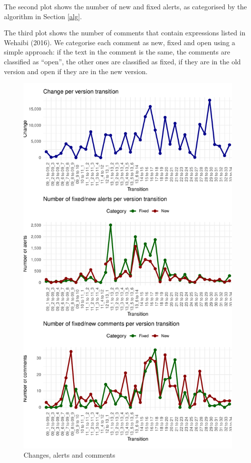 \documentclass[
]{article}
\begin{document}
The second plot shows the number of new and fixed alerts, as categorised
by the algorithm in Section \ref{alg}.

The third plot shows the number of comments that contain expressions
listed in Wehaibi (2016). We categorise each comment as new, fixed and
open using a simple approach: if the text in the comment is the same,
the comments are classified as ``open'', the other ones are classified
as fixed, if they are in the old version and open if they are in the new
version.

\small

\normalsize

\small

\begin{figure}
\centering
\includegraphics{report_files/figure-latex/unnamed-chunk-19-1.pdf}
\caption{\label{timeseries}Changes, alerts and comments}
\end{figure}
\end{document}
